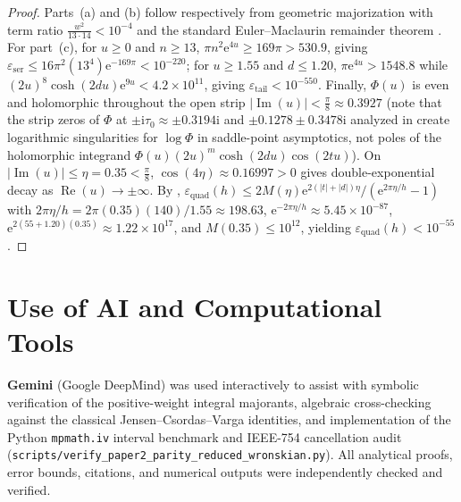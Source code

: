 \documentclass[11pt,a4paper,reqno]{amsart}
\theoremstyle{definition}
\theoremstyle{remark}
\numberwithin{equation}{section}
\newcommand{\ii}{\mathrm{i}}
\newcommand{\ee}{\mathrm{e}}
\newcommand{\Rea}{\operatorname{Re}}
\newcommand{\Ima}{\operatorname{Im}}
\begin{document}
\begin{proof}
Parts~(a) and (b) follow respectively from geometric majorization with term ratio $\frac{w^2}{13 \cdot 14} < 10^{-4}$ and the standard Euler--Maclaurin remainder theorem \cite[Section~6.4]{Titchmarsh1986}. For part~(c), for $u \ge 0$ and $n \ge 13$, $\pi n^2 \ee^{4u} \ge 169\pi > 530.9$, giving $\varepsilon_{\mathrm{ser}} \le 16\pi^2(13^4)\ee^{-169\pi} < 10^{-220}$; for $u \ge 1.55$ and $d \le 1.20$, $\pi\ee^{4u} > 1548.8$ while $(2u)^8\cosh(2du)\ee^{9u} < 4.2 \times 10^{11}$, giving $\varepsilon_{\mathrm{tail}} < 10^{-550}$. Finally, $\Phi(u)$ is even and holomorphic throughout the open strip $|\Ima(u)| < \frac{\pi}{8} \approx 0.3927$ (note that the strip zeros of $\Phi$ at $\pm\ii\tau_0 \approx \pm 0.3194\ii$ and $\pm 0.1278 \pm 0.3478\ii$ analyzed in \cite{Missiaen2026Paper1} create logarithmic singularities for $\log\Phi$ in saddle-point asymptotics, not poles of the holomorphic integrand $\Phi(u)(2u)^m\cosh(2du)\cos(2tu)$). On $|\Ima(u)| \le \eta = 0.35 < \frac{\pi}{8}$, $\cos(4\eta) \approx 0.16997 > 0$ gives double-exponential decay as $\Rea(u) \to \pm\infty$. By \cite[Theorem~5.1]{TrefethenWeideman2014}, $\varepsilon_{\mathrm{quad}}(h) \le 2 M(\eta)\ee^{2(|t|+|d|)\eta}/(\ee^{2\pi\eta/h} - 1)$ with $2\pi\eta/h = 2\pi(0.35)(140)/1.55 \approx 198.63$, $\ee^{-2\pi\eta/h} \approx 5.45 \times 10^{-87}$, $\ee^{2(55+1.20)(0.35)} \approx 1.22 \times 10^{17}$, and $M(0.35) \le 10^{12}$, yielding $\varepsilon_{\mathrm{quad}}(h) < 10^{-55}$.
\end{proof}

\section*{Use of AI and Computational Tools}

\textbf{Gemini} (Google DeepMind) was used interactively to assist with symbolic verification of the positive-weight integral majorants, algebraic cross-checking against the classical Jensen--Csordas--Varga identities, and implementation of the Python \texttt{mpmath.iv} interval benchmark and IEEE-754 cancellation audit (\nolinkurl{scripts/verify_paper2_parity_reduced_wronskian.py}). All analytical proofs, error bounds, citations, and numerical outputs were independently checked and verified.
\end{document}
